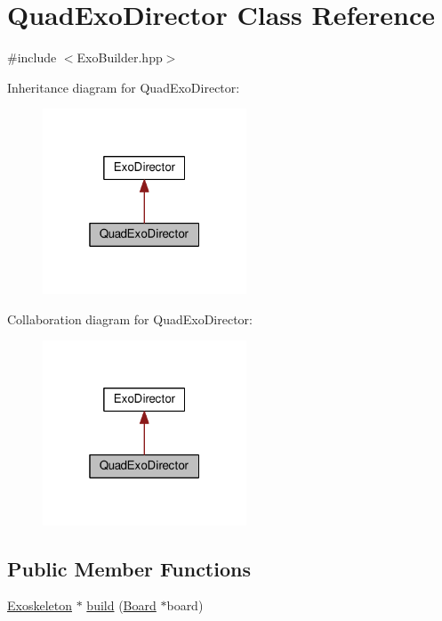 \hypertarget{classQuadExoDirector}{}\section{Quad\+Exo\+Director Class Reference}
\label{classQuadExoDirector}


{\ttfamily \#include $<$Exo\+Builder.\+hpp$>$}



Inheritance diagram for Quad\+Exo\+Director\+:\nopagebreak
\begin{figure}[H]
\begin{center}
\leavevmode
\includegraphics[width=172pt]{classQuadExoDirector__inherit__graph}
\end{center}
\end{figure}


Collaboration diagram for Quad\+Exo\+Director\+:\nopagebreak
\begin{figure}[H]
\begin{center}
\leavevmode
\includegraphics[width=172pt]{classQuadExoDirector__coll__graph}
\end{center}
\end{figure}
\subsection*{Public Member Functions}
\begin{DoxyCompactItemize}
\item 
\hyperlink{classExoskeleton}{Exoskeleton} $\ast$ \hyperlink{classQuadExoDirector_a84ad89c3c1c005ccb40c4b9a91c5e773}{build} (\hyperlink{classBoard}{Board} $\ast$board)
\end{DoxyCompactItemize}


